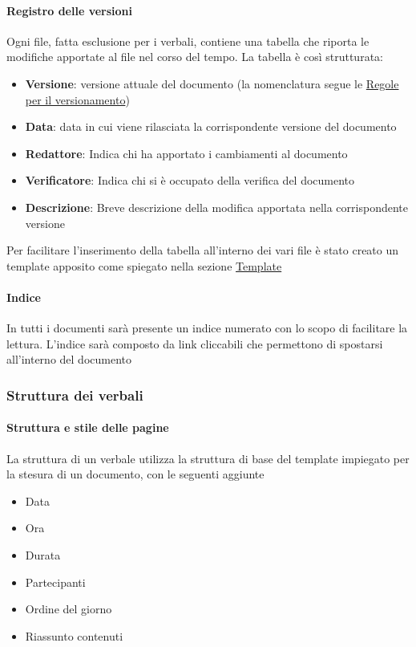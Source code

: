 \documentclass[12pt]{article}
\begin{document}
\paragraph{Registro delle versioni}
Ogni file, fatta esclusione per i verbali, contiene una tabella che riporta le modifiche apportate al file nel corso del tempo.
La tabella è così strutturata:
\begin{itemize}
    \item \textbf{Versione}: versione attuale del documento (la nomenclatura segue le \hyperref[ver]{Regole per il versionamento})
    \item \textbf{Data}: data in cui viene rilasciata la corrispondente versione del documento
    \item \textbf{Redattore}: Indica chi ha apportato i cambiamenti al documento
    \item \textbf{Verificatore}: Indica chi si è occupato della verifica del documento
    \item \textbf{Descrizione}: Breve descrizione della modifica apportata nella corrispondente versione
\end{itemize}
Per facilitare l'inserimento della tabella all'interno dei vari file è stato creato un template apposito come spiegato nella sezione \hyperref[Temp]{Template}

\paragraph{Indice}
In tutti i documenti sarà presente un indice numerato con lo scopo di facilitare la lettura. L'indice sarà composto da link cliccabili che permettono di spostarsi all'interno del documento 

\subsubsection{Struttura dei verbali}
\paragraph{Struttura e stile delle pagine}
La struttura di un verbale utilizza la struttura di base del template impiegato per la stesura di un documento, con le seguenti aggiunte
\begin{itemize}
    \item Data
    \item Ora
    \item Durata
    \item Partecipanti
    \item Ordine del giorno
    \item Riassunto contenuti
\end{itemize}
\end{document}
